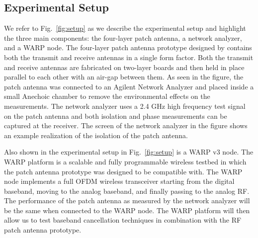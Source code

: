 \documentclass[12pt, journal,draftcls,letterpaper,onecolumn]{IEEEtran}
\begin{document}
\subsection{Experimental Setup}
We refer to Fig.~\ref{fig:setup} as we describe the experimental setup and highlight the three main components: the four-layer patch antenna, a network analyzer, and a WARP node.  The four-layer patch antenna prototype designed by \cite{RISC_WEB} contains both the transmit and receive antennas in a single form factor.  Both the transmit and receive antennas are fabricated on two-layer boards and then held in place parallel to each other with an air-gap between them.  As seen in the figure, the patch antenna was connected to an Agilent Network Analyzer and placed inside a small Anechoic chamber to remove the environmental effects on the measurements.  The network analyzer uses a  2.4 GHz high frequency test signal on the patch antenna and both isolation and phase measurements can be captured at the receiver.  The screen of the network analyzer in the figure shows an example realization of the isolation of the patch antenna.  

Also shown in the experimental setup in Fig.~\ref{fig:setup} is a WARP v3 node.  The WARP platform \cite{WARP_WEBSITE} is a scalable and fully programmable wireless testbed in which the patch antenna prototype was designed to be compatible with.  The WARP node implements a full OFDM wireless transceiver starting from the digital baseband, moving to the analog baseband, and finally passing to the analog RF.  The performance of the patch antenna as measured by the network analyzer will be the same when connected to the WARP node.  The WARP platform will then allow us to test baseband cancellation techniques in combination with the RF patch antenna prototype.  
\end{document}
